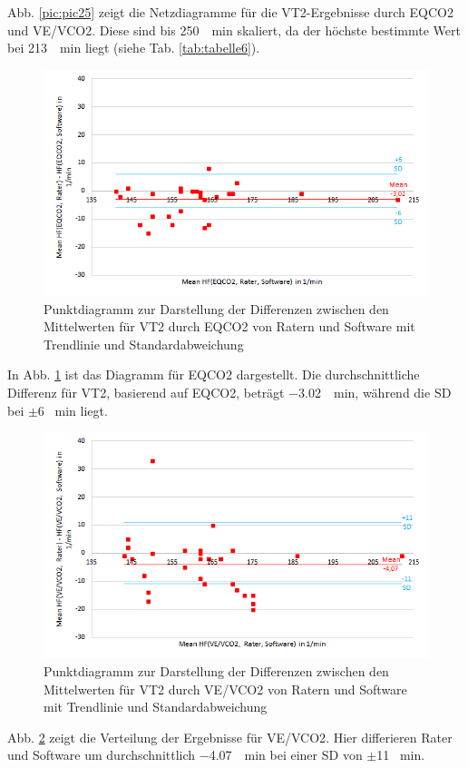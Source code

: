 Abb. \ref{pic:pic25} zeigt die Netzdiagramme für die VT2-Ergebnisse durch \acs{EQCO2} und \acs{VE}/\acs{VCO2}. Diese sind bis \SI{250}{\per\minute} skaliert, da der höchste bestimmte Wert bei \SI{213}{\per\minute} liegt (siehe Tab. \ref{tab:tabelle6}).

\begin{figure}[H]
	\centering
	\includegraphics[scale=0.7]{Bilder/mean_eqco2}
	\caption[Punktdiagramm mit Differenzen für \acs{EQCO2}]{Punktdiagramm zur Darstellung der Differenzen zwischen den Mittelwerten für VT2 durch \acs{EQCO2} von Ratern und Software mit Trendlinie und Standardabweichung}
	\label{pic:pic26}
\end{figure}
\clearpage
In Abb. \ref{pic:pic26} ist das Diagramm für \acs{EQCO2} dargestellt. Die durchschnittliche Differenz für VT2, basierend auf \acs{EQCO2}, beträgt \SI{-3,02}{\per\minute}, während die \acs{SD} bei $\pm$6 \si{\per\minute} liegt.

\begin{figure}[H]
	\centering
	\includegraphics[scale=0.7]{Bilder/mean_vevco2}
	\caption[Punktdiagramm mit Differenzen für \acs{VE}/\acs{VCO2}]{Punktdiagramm zur Darstellung der Differenzen zwischen den Mittelwerten für VT2 durch \acs{VE}/\acs{VCO2} von Ratern und Software mit Trendlinie und Standardabweichung}
	\label{pic:pic27}
\end{figure}

Abb. \ref{pic:pic27} zeigt die Verteilung der Ergebnisse für \acs{VE}/\acs{VCO2}. Hier differieren Rater und Software um durchschnittlich \SI{-4,07}{\per\minute} bei einer \acs{SD} von $\pm$11 \si{\per\minute}.